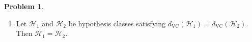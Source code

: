 \documentclass[10pt]{exam}
\theoremstyle{definition}
\newtheorem{problem}{Problem}
\newcommand{\mH}{m_{\mathcal H}}
\newcommand{\dvc}{{d_{\text{VC}}}}
\begin{document}
\begin{problem}
\begin{enumerate}
        \item
            Let $\mathcal H_1$ and $\mathcal H_2$ be hypothesis classes satisfying $\dvc(\mathcal H_1) = \dvc(\mathcal H_2)$.
            Then $\mathcal H_1 = \mathcal H_2$.
            \vspace{3in}
    \end{enumerate}
\end{problem}

\end{document}
